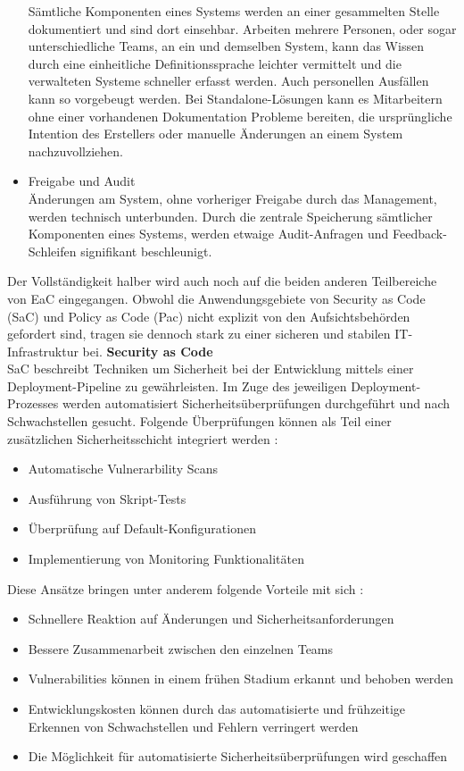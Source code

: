 \begin{itemize}
        Sämtliche Komponenten eines Systems werden an einer gesammelten Stelle dokumentiert und sind dort einsehbar. Arbeiten mehrere Personen, oder sogar unterschiedliche Teams, an ein und demselben System, kann das Wissen durch eine einheitliche Definitionssprache leichter vermittelt und die verwalteten Systeme schneller erfasst werden. Auch personellen Ausfällen kann so vorgebeugt werden. Bei Standalone-Lösungen kann es Mitarbeitern ohne einer vorhandenen Dokumentation Probleme bereiten, die ursprüngliche Intention des Erstellers oder manuelle Änderungen an einem System nachzuvollziehen.
    \item Freigabe und Audit\\
        Änderungen am System, ohne vorheriger Freigabe durch das Management, werden technisch unterbunden. Durch die zentrale Speicherung sämtlicher Komponenten eines Systems, werden etwaige Audit-Anfragen und Feedback-Schleifen signifikant beschleunigt.
\end{itemize} 
\bigbreak
Der Vollständigkeit halber wird auch noch auf die beiden anderen Teilbereiche von EaC eingegangen. Obwohl die Anwendungsgebiete von \glqq{}Security as Code\grqq{} (SaC) und \glqq{}Policy as Code\grqq{} (Pac) nicht explizit von den Aufsichtsbehörden gefordert sind, tragen sie dennoch stark zu einer sicheren und stabilen IT-Infrastruktur bei. 
\bigbreak
\textbf{Security as Code}\\
SaC beschreibt Techniken um Sicherheit bei der Entwicklung mittels einer Deployment-Pipeline zu gewährleisten. Im Zuge des jeweiligen Deployment-Prozesses werden automatisiert Sicherheitsüberprüfungen durchgeführt und nach Schwachstellen gesucht.
Folgende Überprüfungen können als Teil einer zusätzlichen Sicherheitsschicht integriert werden \autocite{hackernoon_2020}:
\begin{itemize}
    \item Automatische Vulnerarbility Scans
    \item Ausführung von Skript-Tests
    \item Überprüfung auf Default-Konfigurationen
    \item Implementierung von Monitoring Funktionalitäten
\end{itemize}
\bigbreak
Diese Ansätze bringen unter anderem folgende Vorteile mit sich \autocite{hackernoon_2020}:
\begin{itemize}
    \item Schnellere Reaktion auf Änderungen und Sicherheitsanforderungen
    \item Bessere Zusammenarbeit zwischen den einzelnen Teams
    \item Vulnerabilities können in einem frühen Stadium erkannt und behoben werden
    \item Entwicklungskosten können durch das automatisierte und frühzeitige Erkennen von
    Schwachstellen und Fehlern verringert werden
    \item Die Möglichkeit für automatisierte Sicherheitsüberprüfungen wird geschaffen
\end{itemize}
